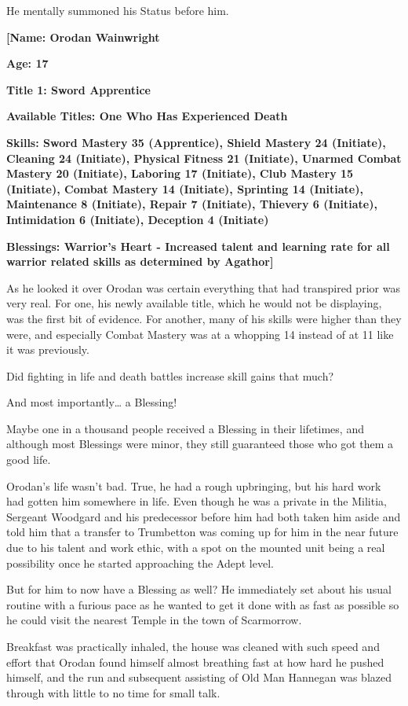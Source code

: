 \documentclass[a4paper,10pt]{book}
\begin{document}
He mentally summoned his Status before him.\par
\textbf{[Name: Orodan Wainwright}\par
\textbf{Age: 17}\par
\textbf{Title 1: Sword Apprentice}\par
\textbf{Available Titles: One Who Has Experienced Death}\par
\textbf{Skills: Sword Mastery 35 (Apprentice), Shield Mastery 24 (Initiate), Cleaning 24 (Initiate), Physical Fitness 21 (Initiate), Unarmed Combat Mastery 20 (Initiate), Laboring 17 (Initiate), Club Mastery 15 (Initiate), Combat Mastery 14 (Initiate), Sprinting 14 (Initiate), Maintenance 8 (Initiate), Repair 7 (Initiate), Thievery 6 (Initiate), Intimidation 6 (Initiate), Deception 4 (Initiate)}\par
\textbf{Blessings: Warrior’s Heart - Increased talent and learning rate for all warrior related skills as determined by Agathor]}\par
As he looked it over Orodan was certain everything that had transpired prior was very real. For one, his newly available title, which he would not be displaying, was the first bit of evidence. For another, many of his skills were higher than they were, and especially Combat Mastery was at a whopping 14 instead of at 11 like it was previously.\par
Did fighting in life and death battles increase skill gains that much?\par
And most importantly… a Blessing!\par
Maybe one in a thousand people received a Blessing in their lifetimes, and although most Blessings were minor, they still guaranteed those who got them a good life.\par
Orodan’s life wasn’t bad. True, he had a rough upbringing, but his hard work had gotten him somewhere in life. Even though he was a private in the Militia, Sergeant Woodgard and his predecessor before him had both taken him aside and told him that a transfer to Trumbetton was coming up for him in the near future due to his talent and work ethic, with a spot on the mounted unit being a real possibility once he started approaching the Adept level.\par
But for him to now have a Blessing as well? He immediately set about his usual routine with a furious pace as he wanted to get it done with as fast as possible so he could visit the nearest Temple in the town of Scarmorrow.\par
Breakfast was practically inhaled, the house was cleaned with such speed and effort that Orodan found himself almost breathing fast at how hard he pushed himself, and the run and subsequent assisting of Old Man Hannegan was blazed through with little to no time for small talk.\par
\end{document}
